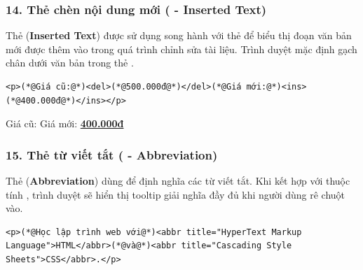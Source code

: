 \subsubsection{14. Thẻ chèn nội dung mới ( - Inserted Text)}

Thẻ  (\textbf{Inserted Text}) được sử dụng song hành với thẻ  để biểu thị đoạn văn bản mới được thêm vào trong quá trình chỉnh sửa tài liệu. Trình duyệt mặc định gạch chân dưới văn bản trong thẻ .

\begin{codeWindow}
\begin{lstlisting}[language=HTML5]
<p>(*@Giá cũ:@*)<del>(*@500.000đ@*)</del>(*@Giá mới:@*)<ins>(*@400.000đ@*)</ins></p>
\end{lstlisting}
\end{codeWindow}

\begin{tcolorbox}[
    enhanced, colback=white, colframe=primaryBlue!20, arc=6pt, boxrule=0.8pt, drop shadow=black!3!white,
    top=8pt, bottom=8pt, left=12pt, right=12pt,
    title={\sffamily\bfseries\scriptsize\color{codeComment} KẾT QUẢ HIỂN THỊ TRÊN TRÌNH DUYỆT (BROWSER PREVIEW)},
    coltitle=codeComment, colbacktitle=codeBg!80!white
]
Giá cũ:  Giá mới: \underline{\textbf{\color{codeString}400.000đ}}
\end{tcolorbox}

\subsubsection{15. Thẻ từ viết tắt ( - Abbreviation)}

Thẻ  (\textbf{Abbreviation}) dùng để định nghĩa các từ viết tắt. Khi kết hợp với thuộc tính , trình duyệt sẽ hiển thị tooltip giải nghĩa đầy đủ khi người dùng rê chuột vào.

\begin{codeWindow}
\begin{lstlisting}[language=HTML5]
<p>(*@Học lập trình web với@*)<abbr title="HyperText Markup Language">HTML</abbr>(*@và@*)<abbr title="Cascading Style Sheets">CSS</abbr>.</p>
\end{lstlisting}
\end{codeWindow}

